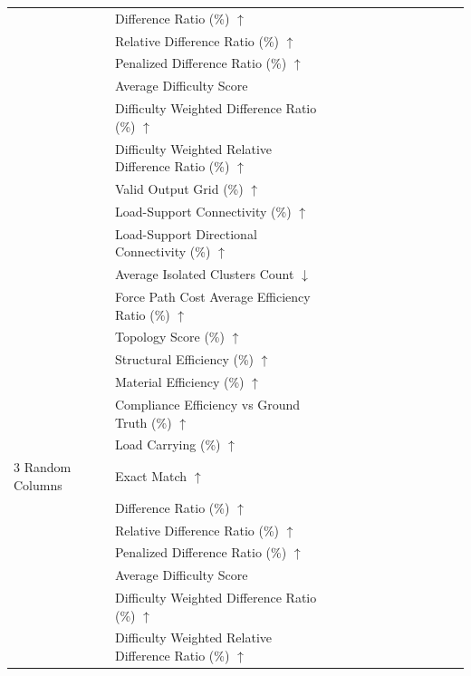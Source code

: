 \begin{table}[!h]
{\begin{tabular}{llllllllllll}
 & Difference Ratio (\%) $\uparrow$ &  &  &  &  &  &  &  &  &  &  \\
 & Relative Difference Ratio (\%) $\uparrow$ &  &  &  &  &  &  &  &  &  &  \\
 & Penalized Difference Ratio (\%) $\uparrow$ &  &  &  &  &  &  &  &  &  &  \\
 & Average Difficulty Score &  &  &  &  &  &  &  &  &  &  \\
 & Difficulty Weighted Difference Ratio (\%) $\uparrow$ &  &  &  &  &  &  &  &  &  &  \\
 & Difficulty Weighted Relative Difference Ratio (\%) $\uparrow$ &  &  &  &  &  &  &  &  &  &  \\
 & Valid Output Grid (\%) $\uparrow$ &  &  &  &  &  &  &  &  &  &  \\
 & Load-Support Connectivity (\%) $\uparrow$ &  &  &  &  &  &  &  &  &  &  \\
 & Load-Support Directional Connectivity (\%) $\uparrow$ &  &  &  &  &  &  &  &  &  &  \\
 & Average Isolated Clusters Count $\downarrow$ &  &  &  &  &  &  &  &  &  &  \\
 & Force Path Cost Average Efficiency Ratio (\%) $\uparrow$ &  &  &  &  &  &  &  &  &  &  \\
 & Topology Score (\%) $\uparrow$ &  &  &  &  &  &  &  &  &  &  \\
 & Structural Efficiency (\%) $\uparrow$ &  &  &  &  &  &  &  &  &  &  \\
 & Material Efficiency (\%) $\uparrow$ &  &  &  &  &  &  &  &  &  &  \\
 & Compliance Efficiency vs Ground Truth (\%) $\uparrow$ &  &  &  &  &  &  &  &  &  &  \\
 & Load Carrying (\%) $\uparrow$ &  &  &  &  &  &  &  &  &  &  \\
3 Random Columns & Exact Match $\uparrow$ &  &  &  &  &  &  &  &  &  &  \\
 & Difference Ratio (\%) $\uparrow$ &  &  &  &  &  &  &  &  &  &  \\
 & Relative Difference Ratio (\%) $\uparrow$ &  &  &  &  &  &  &  &  &  &  \\
 & Penalized Difference Ratio (\%) $\uparrow$ &  &  &  &  &  &  &  &  &  &  \\
 & Average Difficulty Score &  &  &  &  &  &  &  &  &  &  \\
 & Difficulty Weighted Difference Ratio (\%) $\uparrow$ &  &  &  &  &  &  &  &  &  &  \\
 & Difficulty Weighted Relative Difference Ratio (\%) $\uparrow$ &  &  &  &  &  &  &  &  &  &  \\

\end{tabular}}
\end{table}
